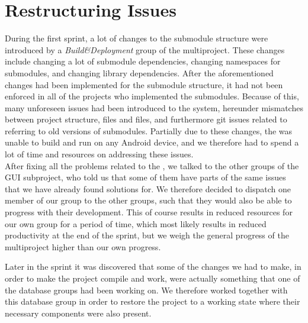 \section{Restructuring Issues}
\label{sec:restructuring_issues}

During the first sprint, a lot of changes to the submodule structure were introduced by a \emph{Build\&Deployment} group of the multiproject. These changes include changing a lot of submodule dependencies, changing namespaces for submodules, and changing library dependencies. After the aforementioned changes had been implemented for the submodule structure, it had not been enforced in all of the \giraf projects who implemented the submodules. Because of this, many unforeseen issues had been introduced to the system, hereunder mismatches between project structure,  files and  files, and furthermore git issues related to referring to old versions of submodules. Partially due to these changes, the \ct was unable to build and run on any Android device, and we therefore had to spend a lot of time and resources on addressing these issues. \\

After fixing all the problems related to the \ct, we talked to the other groups of the GUI subproject, who told us that some of them have parts of the same issues that we have already found solutions for. We therefore decided to dispatch one member of our group to the other groups, such that they would also be able to progress with their development. This of course results in reduced resources for our own group for a period of time, which most likely results in reduced productivity at the end of the sprint, but we weigh the general progress of the multiproject higher than our own progress. 

Later in the sprint it was discovered that some of the changes we had to make, in order to make the project compile and work, were actually something that one of the database groups had been working on. We therefore worked together with this database group in order to restore the project to a working state where their necessary components were also present.